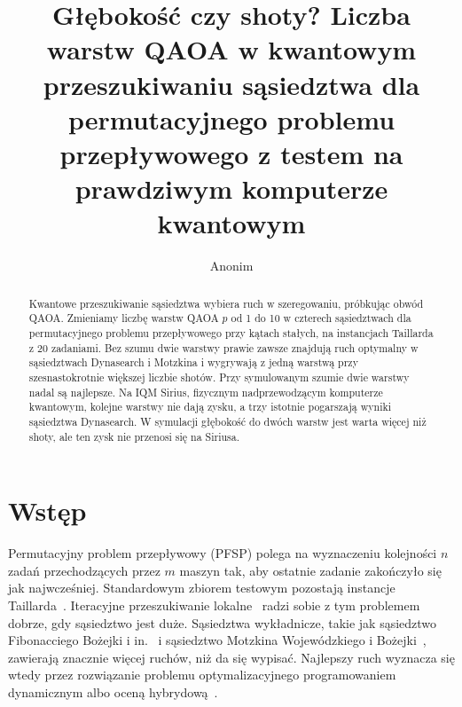 \documentclass[runningheads]{llncs}
\begin{document}
\title{Głębokość czy shoty? Liczba warstw QAOA w kwantowym przeszukiwaniu
sąsiedztwa dla permutacyjnego problemu przepływowego z testem na
prawdziwym komputerze kwantowym}
\author{Anonim}
\maketitle

\begin{abstract}
Kwantowe przeszukiwanie sąsiedztwa wybiera ruch w szeregowaniu, próbkując
obwód QAOA. Zmieniamy liczbę warstw QAOA $p$ od 1 do 10 w czterech
sąsiedztwach dla permutacyjnego problemu przepływowego przy kątach stałych,
na instancjach Taillarda z 20 zadaniami. Bez szumu dwie warstwy prawie zawsze
znajdują ruch optymalny w sąsiedztwach Dynasearch i Motzkina i wygrywają
z jedną warstwą przy szesnastokrotnie większej liczbie shotów. Przy
symulowanym szumie dwie warstwy nadal są najlepsze. Na IQM Sirius, fizycznym
nadprzewodzącym komputerze kwantowym, kolejne warstwy nie dają zysku, a trzy
istotnie pogarszają wyniki sąsiedztwa Dynasearch. W symulacji głębokość do
dwóch warstw jest warta więcej niż shoty, ale ten zysk nie przenosi się na
Siriusa.
\end{abstract}

\section{Wstęp}

Permutacyjny problem przepływowy (PFSP) polega na wyznaczeniu kolejności
$n$ zadań przechodzących przez $m$ maszyn tak, aby ostatnie zadanie
zakończyło się jak najwcześniej. Standardowym zbiorem testowym pozostają
instancje Taillarda~\cite{taillard1993}. Iteracyjne przeszukiwanie
lokalne~\cite{lourenco2003} radzi sobie z tym problemem dobrze, gdy
sąsiedztwo jest duże. Sąsiedztwa wykładnicze, takie jak sąsiedztwo
Fibonacciego Bożejki i in.~\cite{bozejko2026new} i sąsiedztwo Motzkina
Wojewódzkiego i Bożejki~\cite{wojewodzki2026soco,wojewodzki2025exit},
zawierają znacznie więcej ruchów, niż da się wypisać. Najlepszy ruch wyznacza się wtedy przez rozwiązanie problemu
optymalizacyjnego programowaniem dynamicznym albo oceną
hybrydową~\cite{wojewodzki2026icaisc}.
\end{document}
